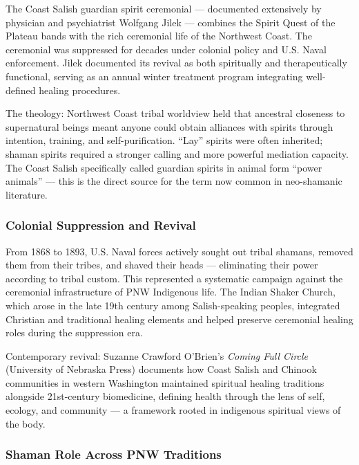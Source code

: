 \documentclass[11pt,letterpaper]{article}
\begin{document}
The Coast Salish guardian spirit ceremonial --- documented extensively by physician and psychiatrist Wolfgang Jilek --- combines the Spirit Quest of the Plateau bands with the rich ceremonial life of the Northwest Coast. The ceremonial was suppressed for decades under colonial policy and U.S. Naval enforcement. Jilek documented its revival as both spiritually and therapeutically functional, serving as an annual winter treatment program integrating well-defined healing procedures.

The theology: Northwest Coast tribal worldview held that ancestral closeness to supernatural beings meant anyone could obtain alliances with spirits through intention, training, and self-purification. ``Lay'' spirits were often inherited; shaman spirits required a stronger calling and more powerful mediation capacity. The Coast Salish specifically called guardian spirits in animal form ``power animals'' --- this is the direct source for the term now common in neo-shamanic literature.

\subsubsection{Colonial Suppression and Revival}

From 1868 to 1893, U.S. Naval forces actively sought out tribal shamans, removed them from their tribes, and shaved their heads --- eliminating their power according to tribal custom. This represented a systematic campaign against the ceremonial infrastructure of PNW Indigenous life. The Indian Shaker Church, which arose in the late 19th century among Salish-speaking peoples, integrated Christian and traditional healing elements and helped preserve ceremonial healing roles during the suppression era.

Contemporary revival: Suzanne Crawford O'Brien's \emph{Coming Full Circle} (University of Nebraska Press) documents how Coast Salish and Chinook communities in western Washington maintained spiritual healing traditions alongside 21st-century biomedicine, defining health through the lens of self, ecology, and community --- a framework rooted in indigenous spiritual views of the body.

\subsubsection{Shaman Role Across PNW Traditions}
\end{document}
